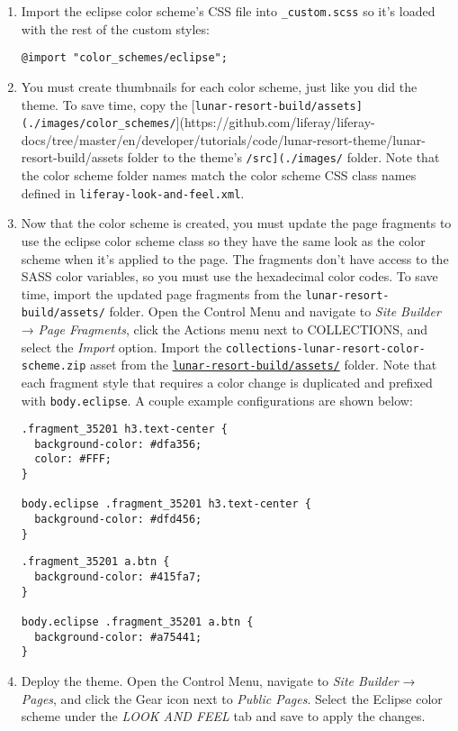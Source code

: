 \begin{enumerate}
\begin{verbatim}
}
\end{verbatim}
\item
  Import the eclipse color scheme's CSS file into \texttt{\_custom.scss}
  so it's loaded with the rest of the custom styles:

\begin{verbatim}
@import "color_schemes/eclipse";
\end{verbatim}
\item
  You must create thumbnails for each color scheme, just like you did
  the theme. To save time, copy the
  {[}\texttt{lunar-resort-build/assets{]}(./images/color\_schemes/}{]}(https://github.com/liferay/liferay-docs/tree/master/en/developer/tutorials/code/lunar-resort-theme/lunar-resort-build/assets
  folder to the theme's \texttt{/src{]}(./images/} folder. Note that the
  color scheme folder names match the color scheme CSS class names
  defined in \texttt{liferay-look-and-feel.xml}.
\item
  Now that the color scheme is created, you must update the page
  fragments to use the eclipse color scheme class so they have the same
  look as the color scheme when it's applied to the page. The fragments
  don't have access to the SASS color variables, so you must use the
  hexadecimal color codes. To save time, import the updated page
  fragments from the \texttt{lunar-resort-build/assets/} folder. Open
  the Control Menu and navigate to \emph{Site Builder} → \emph{Page
  Fragments}, click the Actions menu next to COLLECTIONS, and select the
  \emph{Import} option. Import the
  \texttt{collections-lunar-resort-color-scheme.zip} asset from the
  \href{https://github.com/liferay/liferay-docs/tree/master/en/developer/tutorials/code/lunar-resort-theme/lunar-resort-build/assets}{\texttt{lunar-resort-build/assets/}}
  folder. Note that each fragment style that requires a color change is
  duplicated and prefixed with \texttt{body.eclipse}. A couple example
  configurations are shown below:

\begin{verbatim}
.fragment_35201 h3.text-center {
  background-color: #dfa356;
  color: #FFF;
}

body.eclipse .fragment_35201 h3.text-center {
  background-color: #dfd456;
}
\end{verbatim}

\begin{verbatim}
.fragment_35201 a.btn {
  background-color: #415fa7;
}

body.eclipse .fragment_35201 a.btn {
  background-color: #a75441;
}
\end{verbatim}
\item
  Deploy the theme. Open the Control Menu, navigate to \emph{Site
  Builder} → \emph{Pages}, and click the Gear icon next to \emph{Public
  Pages}. Select the Eclipse color scheme under the \emph{LOOK AND FEEL}
  tab and save to apply the changes.


\end{enumerate}
